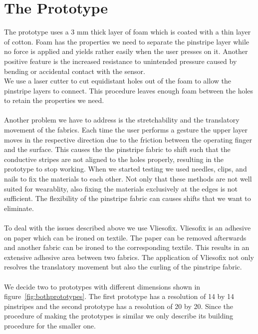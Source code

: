 \section{The Prototype}
The prototype uses a 3 mm thick layer of foam which is coated with a thin layer of cotton. Foam has the properties we need to separate the pinstripe layer while no force is applied and yields rather easily when the user presses on it. Another positive feature is the increased resistance to unintended pressure caused by bending or accidental contact with the sensor.
\\
We use a laser cutter to cut equidistant holes out of the foam to allow the pinstripe layers to connect. This procedure leaves enough foam between the holes to retain the properties we need. \\ \\
Another problem we have to address is the stretchability and the translatory movement of the fabrics. Each time the user performs a gesture the upper layer moves in the respective direction due to the friction between the operating finger and the surface. This causes the the pinstripe fabric to shift such that the conductive stripes are not aligned to the holes properly, resulting in the prototype to stop working. When we started testing we used needles, clips, and nails to fix the materials to each other. Not only that these methods are not well suited for wearablity, also fixing the materials exclusively at the edges is not sufficient.  The flexibility of the pinstripe fabric can causes shifts that we want to eliminate. 
\\ \\
 To deal with the issues described above we use Vliesofix. Vliesofix is an adhesive on paper which can be ironed on textile. The paper can be removed afterwards and another fabric can be ironed to the corresponding textile. This results in an extensive adhesive area between two fabrics. The application of Vliesofix not only resolves the translatory movement but also the curling of the pinstripe fabric.
\\ \\
We decide two to prototypes with different dimensions shown in figure~\ref{fig:bothprototypes}. The first prototype has a resolution of 14 by 14 pinstripes and the second prototype has a resolution of 20 by 20. Since the procedure of making the prototypes is similar we only describe its building procedure for the smaller one. 
